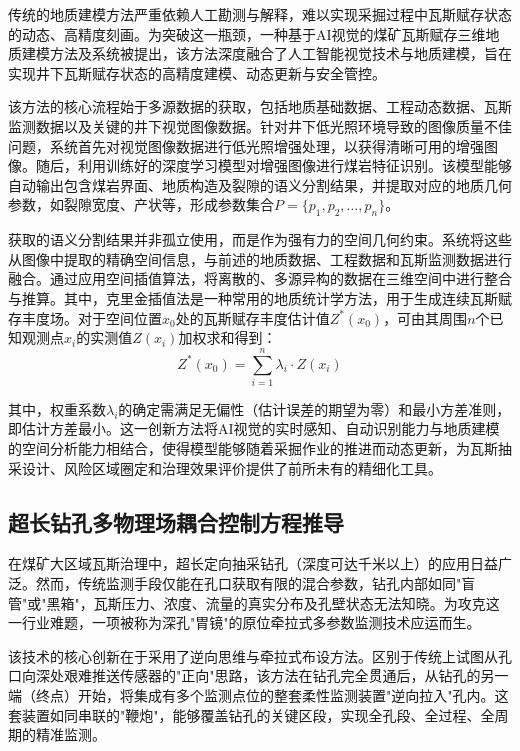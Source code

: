 \documentclass[twocolumn,a4paper]{ctexart}
\numberwithin{equation}{section}
\begin{document}
传统的地质建模方法严重依赖人工勘测与解释，难以实现采掘过程中瓦斯赋存状态的动态、高精度刻画。为突破这一瓶颈，一种基于AI视觉的煤矿瓦斯赋存三维地质建模方法及系统被提出，该方法深度融合了人工智能视觉技术与地质建模，旨在实现井下瓦斯赋存状态的高精度建模、动态更新与安全管控。

该方法的核心流程始于多源数据的获取，包括地质基础数据、工程动态数据、瓦斯监测数据以及关键的井下视觉图像数据。针对井下低光照环境导致的图像质量不佳问题，系统首先对视觉图像数据进行低光照增强处理，以获得清晰可用的增强图像。随后，利用训练好的深度学习模型对增强图像进行煤岩特征识别。该模型能够自动输出包含煤岩界面、地质构造及裂隙的语义分割结果，并提取对应的地质几何参数，如裂隙宽度、产状等，形成参数集合$P=\{p_1,p_2,\ldots,p_n\}$。

获取的语义分割结果并非孤立使用，而是作为强有力的空间几何约束。系统将这些从图像中提取的精确空间信息，与前述的地质数据、工程数据和瓦斯监测数据进行融合。通过应用空间插值算法，将离散的、多源异构的数据在三维空间中进行整合与推算。其中，克里金插值法是一种常用的地质统计学方法，用于生成连续瓦斯赋存丰度场。对于空间位置$x_0$处的瓦斯赋存丰度估计值$Z^*(x_0)$，可由其周围$n$个已知观测点$x_i$的实测值$Z(x_i)$加权求和得到：
\begin{equation}
Z^*(x_0) = \sum_{i=1}^{n} \lambda_i \cdot Z(x_i)
\end{equation}

其中，权重系数$\lambda_i$的确定需满足无偏性（估计误差的期望为零）和最小方差准则，即估计方差最小。这一创新方法将AI视觉的实时感知、自动识别能力与地质建模的空间分析能力相结合，使得模型能够随着采掘作业的推进而动态更新，为瓦斯抽采设计、风险区域圈定和治理效果评价提供了前所未有的精细化工具。

\subsection{超长钻孔多物理场耦合控制方程推导}

在煤矿大区域瓦斯治理中，超长定向抽采钻孔（深度可达千米以上）的应用日益广泛。然而，传统监测手段仅能在孔口获取有限的混合参数，钻孔内部如同"盲管"或"黑箱"，瓦斯压力、浓度、流量的真实分布及孔壁状态无法知晓。为攻克这一行业难题，一项被称为深孔"胃镜"的原位牵拉式多参数监测技术应运而生。

该技术的核心创新在于采用了逆向思维与牵拉式布设方法。区别于传统上试图从孔口向深处艰难推送传感器的"正向"思路，该方法在钻孔完全贯通后，从钻孔的另一端（终点）开始，将集成有多个监测点位的整套柔性监测装置"逆向拉入"孔内。这套装置如同串联的"鞭炮"，能够覆盖钻孔的关键区段，实现全孔段、全过程、全周期的精准监测。
\end{document}
